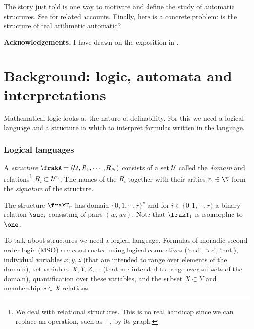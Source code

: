The story just told is one way to motivate and define the study of automatic
structures. See \cite{KhNe95,Rubi08} for related accounts. Finally, here is a
concrete problem: is the structure of real arithmetic automatic?


{\bf Acknowledgements.} I have drawn on the exposition in \cite{BlCoLo07}.

\section{Background: logic, automata and interpretations}

Mathematical logic looks at the nature of definability. For this we need a logical language and a structure in which to interpret
formulas written in the language.
 
\subsubsection{Logical languages}

A \emph{structure}  $\frakA = (\mathcal{U}, R_1, \cdots, R_N)$ consists of a set $\mathcal{U}$ called the {\em domain} and relations\footnote{We deal with relational structures. This is no real handicap since we can replace an operation, such as $+$, by its graph.} $R_i \subset \mathcal{U}^{r_i}$. The names of the $R_i$ together with their arities $r_i \in \N$ form the \emph{signature} of the structure.

\begin{example}
The structure  $\frakT_r$ has domain $\{0,1, \cdots,r\}^\star$ and for $i \in \{0,1, \cdots, r\}$ a binary relation $\suc_i$ consisting of pairs $(w,wi)$. 
Note that $\frakT_1$ is isomorphic to $\one$.
\end{example}


To talk about structures we need a logical language. Formulas of monadic
second-order logic (MSO) are constructed using logical connectives (`and',
`or', `not'), individual variables $x,y,z$ (that are intended to range over
elements of the domain), set variables $X,Y,Z,\cdots$ (that are intended to
range over subsets of the domain), quantification over these variables, and the
subset $X \subset Y$ and membership $x \in X$ relations.

